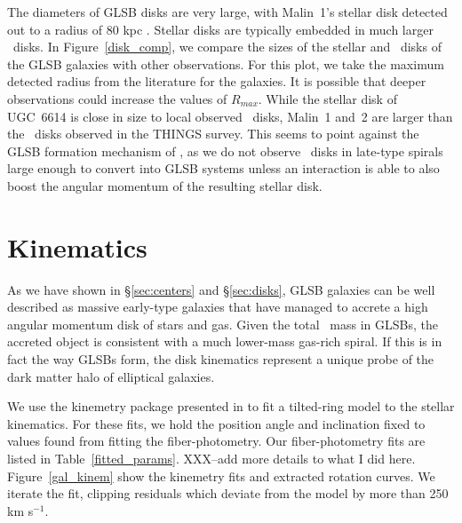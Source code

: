 \documentclass[12pt,preprint]{aastex}
\newcommand\kms{km s$^{-1}$}
\newcommand\HI{\ion{H}{1}}
\begin{document}
The diameters of GLSB disks are very large, with Malin~1's stellar disk detected out to a radius of 80 kpc \citep{Galaz15}.
Stellar disks are typically embedded in much larger \HI\ disks.
In Figure~\ref{disk_comp}, we compare the sizes of the stellar and \HI\ disks of the GLSB galaxies with other observations.
For this plot, we take the maximum detected radius from the literature for the galaxies.
It is possible that deeper observations could increase the values of $R_{max}$.
While the stellar disk of UGC~6614 is close in size to local observed \HI\ disks, Malin~1 and~2 are larger than the \HI\ disks observed in the THINGS survey.
This seems to point against the GLSB formation mechanism of \citet{Mapelli08}, as we do not observe \HI\ disks in late-type spirals large enough to convert into GLSB systems unless an interaction is able to also boost the angular momentum of the resulting stellar disk.


\begin{figure*}
\caption{ Comparison of the GLSB disks with other galaxy disks from the literature.
THINGS data taken from \citet{DeBlok2008}, GLSB \HI\ data from Malin 1 from \citet{Pickering97} and GLSB stellar radii from \citet{Galaz15}, \citet{Kasparova14}, and this paper.
Here, $R_{max}$ is the maximum radius with an \HI\ or optical detection.
For the GLSB galaxies, the circular points show the maximum \HI\ detection radius and stars-shaped points show the maximum detected stellar light radius.
All points are maximum detection radii, and thus should be considered lower limits.
 \label{disk_comp}}
\end{figure*}


\section{Kinematics}\label{sec:kinematics}

As we have shown in \S\ref{sec:centers} and \S\ref{sec:disks}, GLSB galaxies can be well described as massive early-type galaxies that have managed to accrete a high angular momentum disk of stars and gas.
Given the total \HI\ mass in GLSBs, the accreted object is consistent with a much lower-mass gas-rich spiral.
If this is in fact the way GLSBs form, the disk kinematics represent a unique probe of the dark matter halo of elliptical galaxies.

We use the kinemetry package presented in \citet{Krajn06} to fit a tilted-ring model to the stellar kinematics.
For these fits, we hold the position angle and inclination fixed to values found from fitting the fiber-photometry.
Our fiber-photometry fits are listed in Table~\ref{fitted_params}. XXX--add more details to what I did here.
Figure~\ref{gal_kinem} show the kinemetry fits and extracted rotation curves.
We iterate the fit, clipping residuals which deviate from the model by more than 250 \kms.
\end{document}
